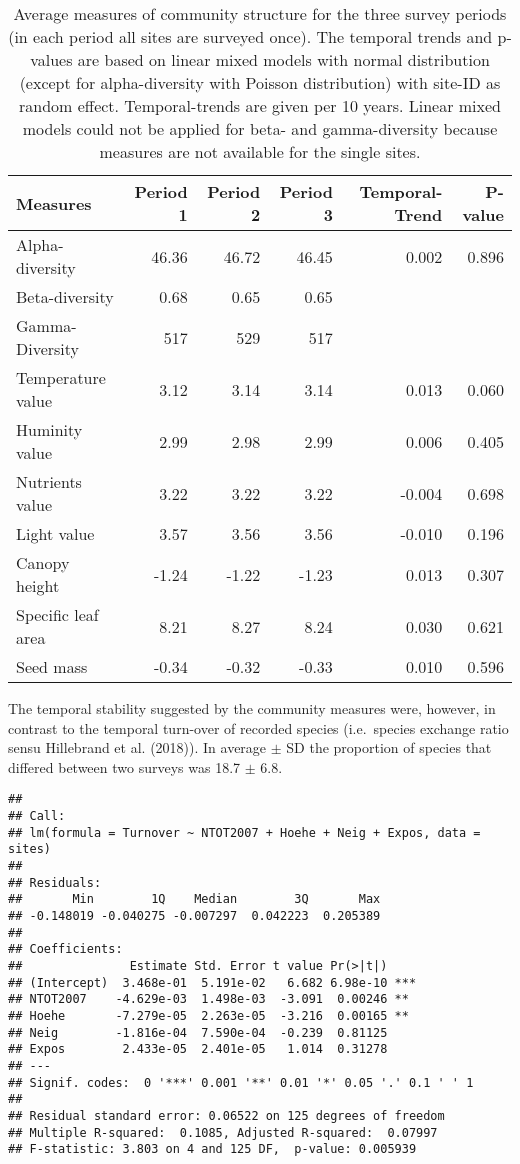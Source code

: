 \documentclass[fleqn,10pt,lineno]{wlpeerj} %
\begin{document}
\begin{table}[ht]
\centering
\begin{tabular}{lrrrrr}
  \hline
Measures & Period 1 & Period 2 & Period 3 & Temporal-Trend & P-value \\ 
  \hline
Alpha-diversity & 46.36 & 46.72 & 46.45 & 0.002 & 0.896 \\ 
  Beta-diversity & 0.68 & 0.65 & 0.65 &  &  \\ 
  Gamma-Diversity & 517 & 529 & 517 &  &  \\ 
  Temperature value & 3.12 & 3.14 & 3.14 & 0.013 & 0.060 \\ 
  Huminity value & 2.99 & 2.98 & 2.99 & 0.006 & 0.405 \\ 
  Nutrients value & 3.22 & 3.22 & 3.22 & -0.004 & 0.698 \\ 
  Light value & 3.57 & 3.56 & 3.56 & -0.010 & 0.196 \\ 
  Canopy height & -1.24 & -1.22 & -1.23 & 0.013 & 0.307 \\ 
  Specific leaf area & 8.21 & 8.27 & 8.24 & 0.030 & 0.621 \\ 
  Seed mass & -0.34 & -0.32 & -0.33 & 0.010 & 0.596 \\ 
   \hline
\end{tabular}
\caption{Average measures of community structure for the three survey periods (in each period all sites are surveyed once). The temporal trends and p-values are based on linear mixed models with normal distribution (except for alpha-diversity with Poisson distribution) with site-ID as random effect. Temporal-trends are given per 10 years. Linear mixed models could not be applied for beta- and gamma-diversity because measures are not available for the single sites.} 
\label{temporaltrends}
\end{table}

The temporal stability suggested by the community measures were,
however, in contrast to the temporal turn-over of recorded species
(i.e.~species exchange ratio sensu Hillebrand et al. (2018)). In average
\(\pm\) SD the proportion of species that differed between two surveys
was 18.7 \(\pm\) 6.8.

\begin{verbatim}
## 
## Call:
## lm(formula = Turnover ~ NTOT2007 + Hoehe + Neig + Expos, data = sites)
## 
## Residuals:
##       Min        1Q    Median        3Q       Max 
## -0.148019 -0.040275 -0.007297  0.042223  0.205389 
## 
## Coefficients:
##               Estimate Std. Error t value Pr(>|t|)    
## (Intercept)  3.468e-01  5.191e-02   6.682 6.98e-10 ***
## NTOT2007    -4.629e-03  1.498e-03  -3.091  0.00246 ** 
## Hoehe       -7.279e-05  2.263e-05  -3.216  0.00165 ** 
## Neig        -1.816e-04  7.590e-04  -0.239  0.81125    
## Expos        2.433e-05  2.401e-05   1.014  0.31278    
## ---
## Signif. codes:  0 '***' 0.001 '**' 0.01 '*' 0.05 '.' 0.1 ' ' 1
## 
## Residual standard error: 0.06522 on 125 degrees of freedom
## Multiple R-squared:  0.1085, Adjusted R-squared:  0.07997 
## F-statistic: 3.803 on 4 and 125 DF,  p-value: 0.005939
\end{verbatim}
\end{document}
